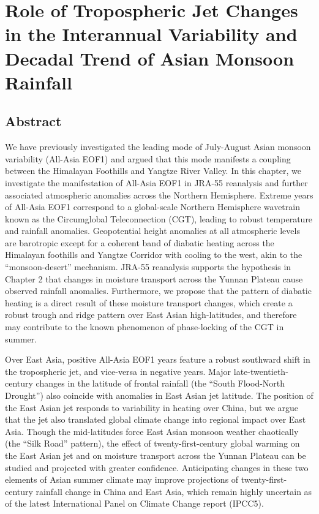 \chapter{Role of Tropospheric Jet Changes in the Interannual Variability and Decadal Trend of Asian Monsoon Rainfall}

\section{Abstract}
We have previously investigated the leading mode of July-August Asian monsoon variability (All-Asia EOF1) and argued that this mode manifests a coupling between the Himalayan Foothills and Yangtze River Valley. In this chapter, we investigate the manifestation of All-Asia EOF1 in JRA-55 reanalysis and further associated atmospheric anomalies across the Northern Hemisphere. Extreme years of All-Asia EOF1 correspond to a global-scale Northern Hemisphere wavetrain known as the Circumglobal Teleconnection (CGT), leading to robust temperature and rainfall anomalies. Geopotential height anomalies at all atmospheric levels are barotropic except for a coherent band of diabatic heating across the Himalayan foothills and Yangtze Corridor with cooling to the west, akin to the ``monsoon-desert'' mechanism. JRA-55 reanalysis supports the hypothesis in Chapter 2 that changes in moisture transport across the Yunnan Plateau cause observed rainfall anomalies. Furthermore, we propose that the pattern of diabatic heating is a direct result of these moisture transport changes, which create a robust trough and ridge pattern over East Asian high-latitudes, and therefore may contribute to the known phenomenon of phase-locking of the CGT in summer. 

Over East Asia, positive All-Asia EOF1 years feature a robust southward shift in the tropospheric jet, and vice-versa in negative years. Major late-twentieth-century changes in the latitude of frontal rainfall (the ``South Flood-North Drought'') also coincide with anomalies in East Asian jet latitude. The position of the East Asian jet responds to variability in heating over China, but we argue that the jet also translated global climate change into regional impact over East Asia. Though the mid-latitudes force East Asian monsoon weather chaotically (the ``Silk Road'' pattern), the effect of twenty-first-century global warming on the East Asian jet and on moisture transport across the Yunnan Plateau can be studied and projected with greater confidence. Anticipating changes in these two elements of Asian summer climate may improve projections of twenty-first-century rainfall change in China and East Asia, which remain highly uncertain as of the latest International Panel on Climate Change report (IPCC5).

